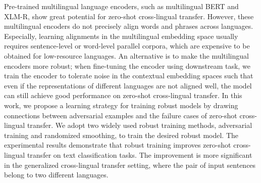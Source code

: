 Pre-trained multilingual language encoders, such as multilingual BERT and XLM-R, show great potential for zero-shot cross-lingual transfer. However, these multilingual encoders do not precisely align words and phrases across languages. Especially, learning alignments in the multilingual embedding space usually requires sentence-level or word-level parallel corpora, which are expensive to be obtained for low-resource languages. An alternative is to make the multilingual encoders more robust; when fine-tuning the encoder using downstream task, we train the encoder to tolerate noise in the contextual embedding spaces such that even if the representations of different languages are not aligned well, the model can still achieve good performance on zero-shot cross-lingual transfer. In this work, we propose a learning strategy for training robust models by drawing connections between adversarial examples and the failure cases of zero-shot cross-lingual transfer. We adopt two widely used robust training methods, adversarial training and randomized smoothing, to train the desired robust model. The experimental results demonstrate that robust training improves zero-shot cross-lingual transfer on text classification tasks. The improvement is more significant in the generalized cross-lingual transfer setting, where the pair of input sentences belong to two different languages.
